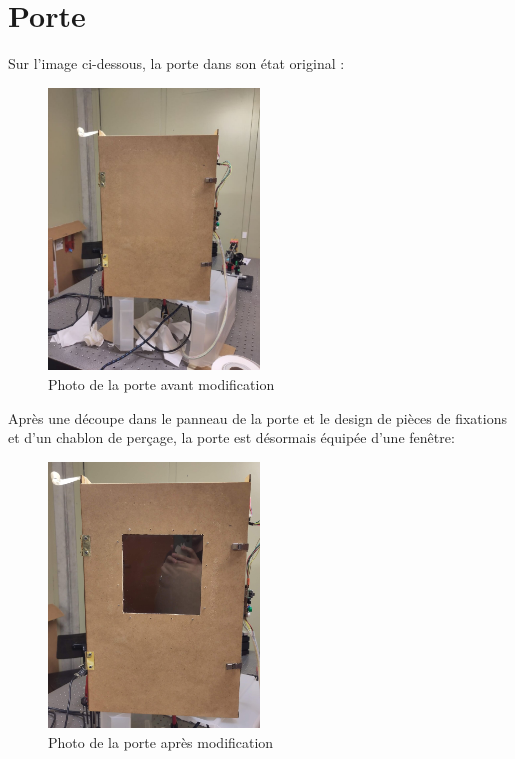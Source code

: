 \section{Porte}
Sur l'image ci-dessous, la porte dans son état original :
\begin{figure}[H]
    \centering
    \includegraphics[width=0.5\textwidth]{assets/figures/ameliorations/porte_sans_fenetre.png}
    \caption{Photo de la porte avant modification}\label{photo porte}
\end{figure}

\newpage
Après une découpe dans le panneau de la porte et le design de pièces de fixations et d'un chablon de perçage,
la porte est désormais équipée d'une fenêtre:
\begin{figure}[H]
    \centering
    \includegraphics[width=0.5\textwidth]{assets/figures/ameliorations/porte_avec_fenetre.jpg}
    \caption{Photo de la porte après modification}\label{photo porte fenetre}
\end{figure}


